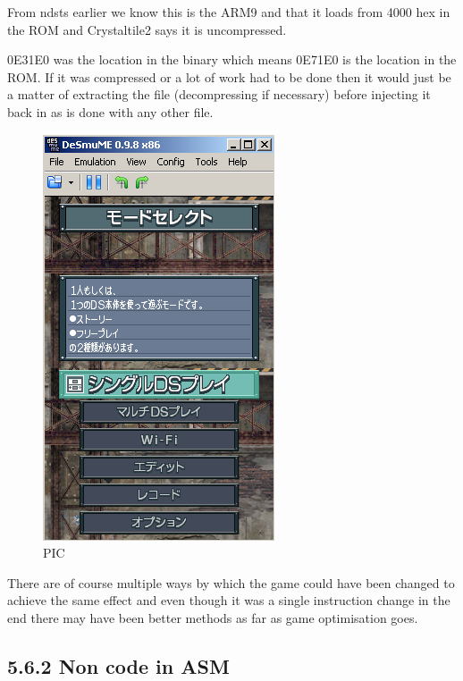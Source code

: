 \documentclass[
]{book}
\begin{document}
From ndsts earlier we know this is the ARM9 and that it loads from 4000 hex in the ROM and Crystaltile2 says it is uncompressed.

0E31E0 was the location in the binary which means 0E71E0 is the location in the ROM. If it was compressed or a lot of work had to be done then it would just be a matter of extracting the file (decompressing if necessary) before injecting it back in as is done with any other file.

\begin{figure}
\centering
\includegraphics{images/219_home_fast6191_romhackingguide_unrenamed_fil___iginal_borders_romhackguideasmlanguagemod_4.png}
\caption{PIC}
\end{figure}

There are of course multiple ways by which the game could have been changed to achieve the same effect and even though it was a single instruction change in the end there may have been better methods as far as game optimisation goes.

\hypertarget{non-code-in-asm}{%
\subsection{5.6.2 Non code in ASM}\label{non-code-in-asm}}
\end{document}
